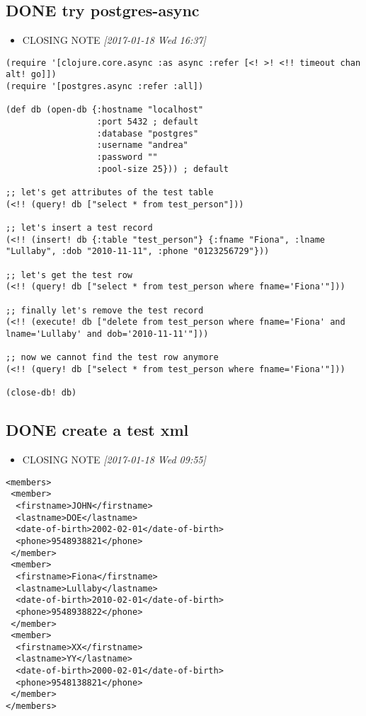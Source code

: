 \documentclass[11pt]{article}
\begin{document}
\subsection{{\bfseries\sffamily DONE} try postgres-async}
\label{sec:org5d2751c}
\begin{itemize}
\item CLOSING NOTE \textit{[2017-01-18 Wed 16:37]}
\end{itemize}
\begin{verbatim}
(require '[clojure.core.async :as async :refer [<! >! <!! timeout chan alt! go]])
(require '[postgres.async :refer :all])

(def db (open-db {:hostname "localhost"
                  :port 5432 ; default
                  :database "postgres"
                  :username "andrea"
                  :password ""
                  :pool-size 25})) ; default

;; let's get attributes of the test table
(<!! (query! db ["select * from test_person"]))

;; let's insert a test record
(<!! (insert! db {:table "test_person"} {:fname "Fiona", :lname "Lullaby", :dob "2010-11-11", :phone "0123256729"}))

;; let's get the test row
(<!! (query! db ["select * from test_person where fname='Fiona'"]))

;; finally let's remove the test record
(<!! (execute! db ["delete from test_person where fname='Fiona' and lname='Lullaby' and dob='2010-11-11'"]))

;; now we cannot find the test row anymore
(<!! (query! db ["select * from test_person where fname='Fiona'"]))

(close-db! db)
\end{verbatim}

\subsection{{\bfseries\sffamily DONE} create a test xml}
\label{sec:orga6bfbdc}
\begin{itemize}
\item CLOSING NOTE \textit{[2017-01-18 Wed 09:55]}
\end{itemize}
\begin{verbatim}
<members>
 <member>
  <firstname>JOHN</firstname>
  <lastname>DOE</lastname>
  <date-of-birth>2002-02-01</date-of-birth>
  <phone>9548938821</phone>
 </member>
 <member>
  <firstname>Fiona</firstname>
  <lastname>Lullaby</lastname>
  <date-of-birth>2010-02-01</date-of-birth>
  <phone>9548938822</phone>
 </member>
 <member>
  <firstname>XX</firstname>
  <lastname>YY</lastname>
  <date-of-birth>2000-02-01</date-of-birth>
  <phone>9548138821</phone>
 </member>
</members>
\end{verbatim}
\end{document}

